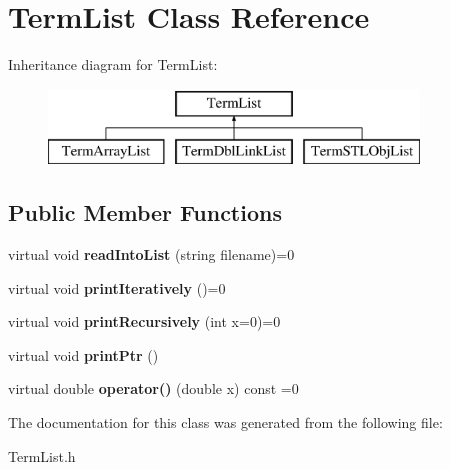 \hypertarget{classTermList}{\section{Term\-List Class Reference}
\label{classTermList}
}
Inheritance diagram for Term\-List\-:\begin{figure}[H]
\begin{center}
\leavevmode
\includegraphics[height=2.000000cm]{classTermList}
\end{center}
\end{figure}
\subsection*{Public Member Functions}
\begin{DoxyCompactItemize}
\item 
\hypertarget{classTermList_a92b997bf037c009d3755440eced88b46}{virtual void {\bfseries read\-Into\-List} (string filename)=0}\label{classTermList_a92b997bf037c009d3755440eced88b46}

\item 
\hypertarget{classTermList_aecfe3d7da152b804ca9c9345d18b6909}{virtual void {\bfseries print\-Iteratively} ()=0}\label{classTermList_aecfe3d7da152b804ca9c9345d18b6909}

\item 
\hypertarget{classTermList_ae7324ddf220e93bb082dc1ac742ad698}{virtual void {\bfseries print\-Recursively} (int x=0)=0}\label{classTermList_ae7324ddf220e93bb082dc1ac742ad698}

\item 
\hypertarget{classTermList_aefbf302b65b5c423735b3a9afd7b6b62}{virtual void {\bfseries print\-Ptr} ()}\label{classTermList_aefbf302b65b5c423735b3a9afd7b6b62}

\item 
\hypertarget{classTermList_ad1600d9d577b619310f06e83e5e847ff}{virtual double {\bfseries operator()} (double x) const =0}\label{classTermList_ad1600d9d577b619310f06e83e5e847ff}

\end{DoxyCompactItemize}


The documentation for this class was generated from the following file\-:\begin{DoxyCompactItemize}
\item 
Term\-List.\-h\end{DoxyCompactItemize}
